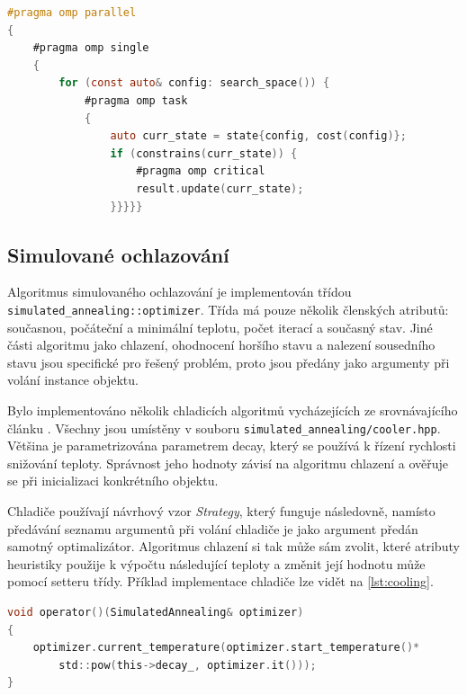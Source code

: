 \begin{lstlisting}[caption={~Optimalizace pomocí algoritmu hrubé síly},label={lst:brute-force},captionpos=t,abovecaptionskip=-\medskipamount,belowcaptionskip=\medskipamount,language=C]
#pragma omp parallel
{
    #pragma omp single
    {
        for (const auto& config: search_space()) {
            #pragma omp task
            {
                auto curr_state = state{config, cost(config)};
                if (constrains(curr_state)) {
                    #pragma omp critical
                    result.update(curr_state);
                }}}}}
\end{lstlisting}

\subsection{Simulované ochlazování}
Algoritmus simulovaného ochlazování je implementován třídou \texttt{simulated\_annealing::optimizer}.
Třída má pouze několik členských atributů: současnou, počáteční a minimální teplotu, počet iterací a současný stav.
Jiné části algoritmu jako chlazení, ohodnocení horšího stavu a nalezení sousedního stavu jsou specifické pro řešený problém, proto jsou předány jako argumenty při volání instance objektu.

Bylo implementováno několik chladicích algoritmů vycházejících ze srovnávajícího článku \cite{cooling-comparison}.
Všechny jsou umístěny v souboru \texttt{simulated\_annealing/cooler.hpp}.
Většina je parametrizována parametrem decay, který se používá k řízení rychlosti snižování teploty.
Správnost jeho hodnoty závisí na algoritmu chlazení a ověřuje se při inicializaci konkrétního objektu.

Chladiče používají návrhový vzor \textit{Strategy}, který funguje následovně, namísto předávání seznamu argumentů při volání chladiče je jako argument předán samotný optimalizátor.
Algoritmus chlazení si tak může sám zvolit, které atributy heuristiky použije k výpočtu následující teploty a změnit její hodnotu může pomocí setteru třídy.
Příklad implementace chladiče lze vidět na \ref{lst:cooling}.

\begin{lstlisting}[caption={~Ukázka implementace chlazení třídy \texttt{simulated\_annealing::exp\_mul\_cooler }},label={lst:cooling},captionpos=t,abovecaptionskip=-\medskipamount,belowcaptionskip=\medskipamount,language=C]
void operator()(SimulatedAnnealing& optimizer)
{
    optimizer.current_temperature(optimizer.start_temperature()*
        std::pow(this->decay_, optimizer.it()));
}
\end{lstlisting}

